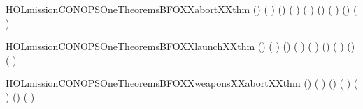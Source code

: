 \newcommand{\HOLmissionCONOPSOneDate}{20 August 2016}
\newcommand{\HOLmissionCONOPSOneTime}{11:38}
\begin{SaveVerbatim}{HOLmissionCONOPSOneTheoremsBFOXXabortXXthm}
\HOLTokenTurnstile{} (\HOLSymConst{,}\HOLSymConst{,})      ( ) \HOLSymConst{\HOLTokenImp{}}
   (\HOLSymConst{,}\HOLSymConst{,})   ( )   ( ) \HOLSymConst{\HOLTokenImp{}}
   (\HOLSymConst{,}\HOLSymConst{,})      ( ) \HOLSymConst{\HOLTokenImp{}}
   (\HOLSymConst{,}\HOLSymConst{,})      ( )
\end{SaveVerbatim}
\newcommand{\HOLmissionCONOPSOneTheoremsBFOXXabortXXthm}{\UseVerbatim{HOLmissionCONOPSOneTheoremsBFOXXabortXXthm}}
\begin{SaveVerbatim}{HOLmissionCONOPSOneTheoremsBFOXXlaunchXXthm}
\HOLTokenTurnstile{} (\HOLSymConst{,}\HOLSymConst{,})      ( ) \HOLSymConst{\HOLTokenImp{}}
   (\HOLSymConst{,}\HOLSymConst{,})   ( )   ( ) \HOLSymConst{\HOLTokenImp{}}
   (\HOLSymConst{,}\HOLSymConst{,})      ( ) \HOLSymConst{\HOLTokenImp{}}
   (\HOLSymConst{,}\HOLSymConst{,})      ( )
\end{SaveVerbatim}
\newcommand{\HOLmissionCONOPSOneTheoremsBFOXXlaunchXXthm}{\UseVerbatim{HOLmissionCONOPSOneTheoremsBFOXXlaunchXXthm}}
\begin{SaveVerbatim}{HOLmissionCONOPSOneTheoremsBFOXXweaponsXXabortXXthm}
\HOLTokenTurnstile{} (\HOLSymConst{,}\HOLSymConst{,})      ( ) \HOLSymConst{\HOLTokenImp{}}
   (\HOLSymConst{,}\HOLSymConst{,}) 
       ( ) 
       ( ) \HOLSymConst{\HOLTokenImp{}}
   (\HOLSymConst{,}\HOLSymConst{,})   ( )
\end{SaveVerbatim}
